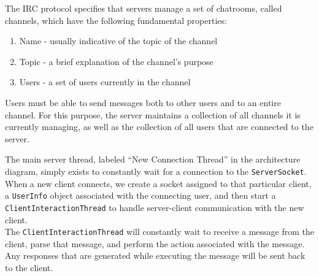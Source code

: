 \documentclass{article}
\begin{document}
The IRC protocol specifies that servers manage a set of chatrooms, called channels,
which have the following fundamental properties:
\begin{enumerate}
    \item
        Name - usually indicative of the topic of the channel
    \item
        Topic - a brief explanation of the channel's purpose
    \item
        Users - a set of users currently in the channel
\end{enumerate}

Users must be able to send messages both to other users and to an entire channel.
For this purpose, the server maintains a collection of all channels it is currently
managing, as well as the collection of all users that are connected to the server.

The main server thread, labeled ``New Connection Thread'' in the architecture diagram,
simply exists to constantly wait for a connection to the \texttt{ServerSocket}.  When
a new client connects, we create a socket assigned to that particular client, a \texttt{UserInfo}
object associated with the connecting user, and then start a \texttt{ClientInteractionThread}
to handle server-client communication with the new client.
\\

The \texttt{ClientInteractionThread} will constantly wait to receive a message from
the client, parse that message, and perform the action associated with the message.
Any responses that are generated while executing the message will be sent back to
the client.
\end{document}
